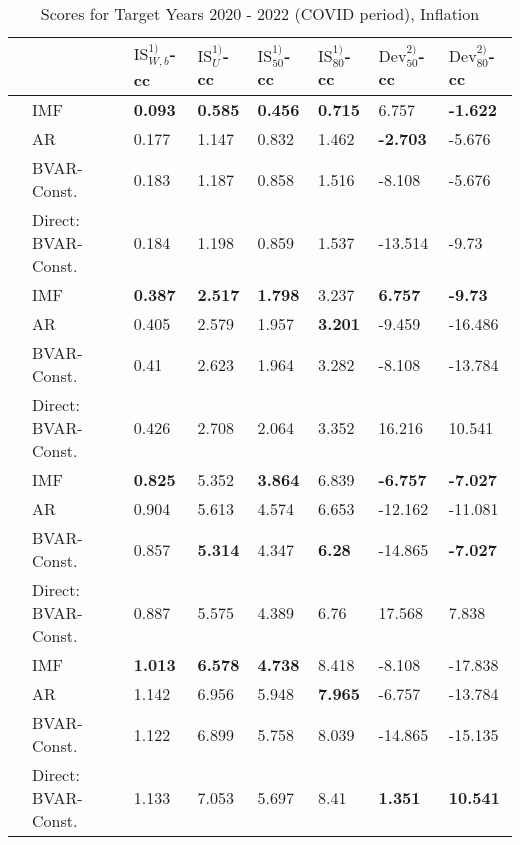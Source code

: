 \begin{table}[!h]
\centering
\caption{Scores for Target Years 2020 - 2022 (COVID period), Inflation}
\centering
\begin{tabular}[t]{llllllll}
\toprule
 &  & $\text{IS}_{W,b}^{1)}$-cc & $\text{IS}_{U}^{1)}$-cc & $\text{IS}_{50}^{1)}$-cc & $\text{IS}_{80}^{1)}$-cc & $\text{Dev}_{50}^{2)}$-cc & $\text{Dev}_{80}^{2)}$-cc\\
\midrule
 & IMF & \textbf{0.093} & \textbf{0.585} & \textbf{0.456} & \textbf{0.715} & 6.757 & \textbf{-1.622}\\
\parbox[t]{2mm}{}
 & AR & 0.177 & 1.147 & 0.832 & 1.462 & \textbf{-2.703} & -5.676\\
 & BVAR-Const. & 0.183 & 1.187 & 0.858 & 1.516 & -8.108 & -5.676\\
 & Direct: BVAR-Const. & 0.184 & 1.198 & 0.859 & 1.537 & -13.514 & -9.73\\
\addlinespace
 & IMF & \textbf{0.387} & \textbf{2.517} & \textbf{1.798} & 3.237 & \textbf{6.757} & \textbf{-9.73}\\
\parbox[t]{2mm}{}
 & AR & 0.405 & 2.579 & 1.957 & \textbf{3.201} & -9.459 & -16.486\\
 & BVAR-Const. & 0.41 & 2.623 & 1.964 & 3.282 & -8.108 & -13.784\\
 & Direct: BVAR-Const. & 0.426 & 2.708 & 2.064 & 3.352 & 16.216 & 10.541\\
\addlinespace
 & IMF & \textbf{0.825} & 5.352 & \textbf{3.864} & 6.839 & \textbf{-6.757} & \textbf{-7.027}\\
\parbox[t]{2mm}{}
 & AR & 0.904 & 5.613 & 4.574 & 6.653 & -12.162 & -11.081\\
 & BVAR-Const. & 0.857 & \textbf{5.314} & 4.347 & \textbf{6.28} & -14.865 & \textbf{-7.027}\\
 & Direct: BVAR-Const. & 0.887 & 5.575 & 4.389 & 6.76 & 17.568 & 7.838\\
\addlinespace
 & IMF & \textbf{1.013} & \textbf{6.578} & \textbf{4.738} & 8.418 & -8.108 & -17.838\\
\parbox[t]{2mm}{}
 & AR & 1.142 & 6.956 & 5.948 & \textbf{7.965} & -6.757 & -13.784\\
 & BVAR-Const. & 1.122 & 6.899 & 5.758 & 8.039 & -14.865 & -15.135\\
 & Direct: BVAR-Const. & 1.133 & 7.053 & 5.697 & 8.41 & \textbf{1.351} & \textbf{10.541}\\
\bottomrule
\end{tabular}
\end{table}
